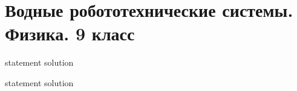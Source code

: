 \chapter{Водные робототехнические системы. Физика. 9 класс}

{statement}
{solution}

{statement}
{solution}